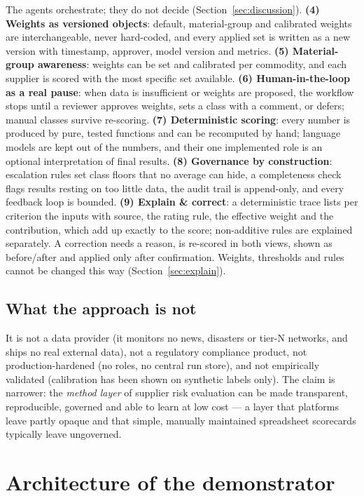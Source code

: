 \documentclass[10pt,twocolumn,a4paper]{article}
\begin{document}
The agents orchestrate; they do not decide (Section~\ref{sec:discussion}).
\textbf{(4) Weights as versioned objects}: default, material-group and calibrated
weights are interchangeable, never hard-coded, and every applied set is written as a new
version with timestamp, approver, model version and metrics.
\textbf{(5) Material-group awareness}: weights can be set and calibrated per commodity,
and each supplier is scored with the most specific set available.
\textbf{(6) Human-in-the-loop as a real pause}: when data is insufficient or weights are
proposed, the workflow stops until a reviewer approves weights, sets a class with a
comment, or defers; manual classes survive re-scoring.
\textbf{(7) Deterministic scoring}: every number is produced by pure, tested functions
and can be recomputed by hand; language models are kept out of the numbers, and their one
implemented role is an optional interpretation of final results.
\textbf{(8) Governance by construction}: escalation rules set class floors that no
average can hide, a completeness check flags results resting on too little data, the
audit trail is append-only, and every feedback loop is bounded.
\textbf{(9) Explain \& correct}: a deterministic trace lists per criterion the inputs with
source, the rating rule, the effective weight and the contribution, which add up exactly to
the score; non-additive rules are explained separately. A correction needs a reason, is
re-scored in both views, shown as before/after and applied only after confirmation. Weights,
thresholds and rules cannot be changed this way (Section~\ref{sec:explain}).

\subsection{What the approach is not}
It is not a data provider (it monitors no news, disasters or tier-N networks, and ships
no real external data), not a regulatory compliance product, not production-hardened (no
roles, no central run store), and not empirically validated (calibration has been shown
on synthetic labels only). The claim is narrower: the \emph{method layer} of supplier
risk evaluation can be made transparent, reproducible, governed and able to learn at low
cost --- a layer that platforms leave partly opaque and that simple, manually maintained
spreadsheet scorecards typically leave ungoverned.

\section{Architecture of the demonstrator}
\label{sec:architecture}
\end{document}
